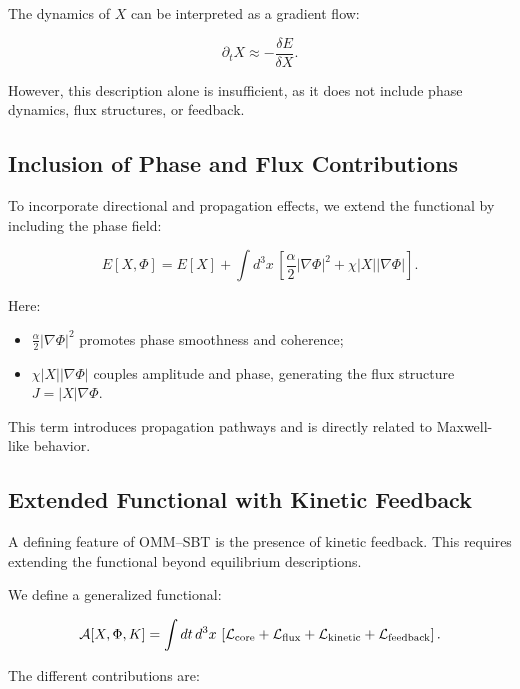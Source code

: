 \documentclass[11pt]{article}
\begin{document}
The dynamics of $X$ can be interpreted as a gradient flow:

\begin{equation}
\partial_t X \approx - \frac{\delta E}{\delta X}.
\end{equation}

However, this description alone is insufficient, as it does not include phase dynamics, flux structures, or feedback.

\subsection{Inclusion of Phase and Flux Contributions}

To incorporate directional and propagation effects, we extend the functional by including the phase field:

\begin{equation}
E[X,\Phi]
=
E[X]
+
\int d^3x \,
\left[
\frac{\alpha}{2} |\nabla \Phi|^2
+
\chi |X||\nabla \Phi|
\right].
\end{equation}

Here:

\begin{itemize}
\item $\frac{\alpha}{2} |\nabla \Phi|^2$ promotes phase smoothness and coherence;
\item $\chi |X||\nabla \Phi|$ couples amplitude and phase, generating the flux structure $J = |X|\nabla \Phi$.
\end{itemize}

This term introduces propagation pathways and is directly related to Maxwell-like behavior.

\subsection{Extended Functional with Kinetic Feedback}

A defining feature of OMM--SBT is the presence of kinetic feedback. This requires extending the functional beyond equilibrium descriptions.

We define a generalized functional:

\begin{equation}
\mathcal{A}[X,\Phi,K]
=
\int dt \, d^3x \,
\left[
\mathcal{L}_{\rm core}
+
\mathcal{L}_{\rm flux}
+
\mathcal{L}_{\rm kinetic}
+
\mathcal{L}_{\rm feedback}
\right].
\end{equation}

The different contributions are:
\end{document}
